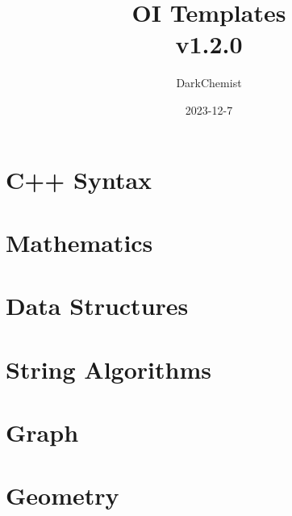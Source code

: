 \documentclass{article}
\title{%
    OI Templates \\
    \large v1.2.0}
\author{DarkChemist}
\date{2023-12-7}
\begin{document}
\maketitle

\tableofcontents
\pagebreak

\section{C++ Syntax}






\pagebreak
\section{Mathematics}








\pagebreak
\section{Data Structures}








\pagebreak
\section{String Algorithms}



\pagebreak
\section{Graph}



\pagebreak
\section{Geometry}

\end{document}
